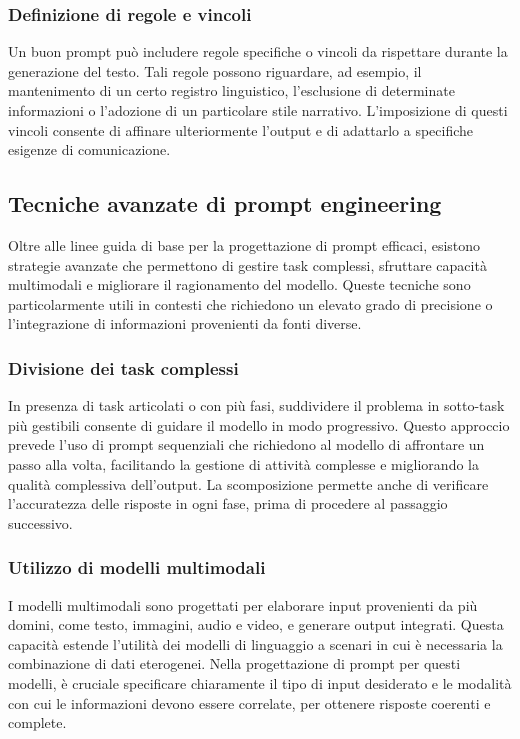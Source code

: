 \documentclass[target=mst,aauheader=,style=]{thud}
\begin{document}
\subsubsection{Definizione di regole e vincoli}
Un buon prompt può includere regole specifiche o vincoli da rispettare durante la generazione del testo. Tali regole possono riguardare, ad esempio, il mantenimento di un certo registro linguistico, l’esclusione di determinate informazioni o l’adozione di un particolare stile narrativo. L’imposizione di questi vincoli consente di affinare ulteriormente l’output e di adattarlo a specifiche esigenze di comunicazione.

\subsection{Tecniche avanzate di prompt engineering}
Oltre alle linee guida di base per la progettazione di prompt efficaci, esistono strategie avanzate che permettono di gestire task complessi, sfruttare capacità multimodali e migliorare il ragionamento del modello. Queste tecniche sono particolarmente utili in contesti che richiedono un elevato grado di precisione o l'integrazione di informazioni provenienti da fonti diverse.

\subsubsection{Divisione dei task complessi}
In presenza di task articolati o con più fasi, suddividere il problema in sotto-task più gestibili consente di guidare il modello in modo progressivo. Questo approccio prevede l'uso di prompt sequenziali che richiedono al modello di affrontare un passo alla volta, facilitando la gestione di attività complesse e migliorando la qualità complessiva dell’output. La scomposizione permette anche di verificare l’accuratezza delle risposte in ogni fase, prima di procedere al passaggio successivo.

\subsubsection{Utilizzo di modelli multimodali}
I modelli multimodali sono progettati per elaborare input provenienti da più domini, come testo, immagini, audio e video, e generare output integrati. Questa capacità estende l'utilità dei modelli di linguaggio a scenari in cui è necessaria la combinazione di dati eterogenei. Nella progettazione di prompt per questi modelli, è cruciale specificare chiaramente il tipo di input desiderato e le modalità con cui le informazioni devono essere correlate, per ottenere risposte coerenti e complete.
\end{document}
